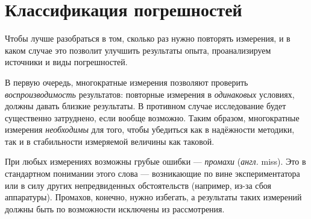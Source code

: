 \enlargethispage{1em}



\section{Классификация погрешностей}

Чтобы лучше разобраться в том, сколько раз нужно повторять измерения,
и в каком случае это позволит улучшить результаты опыта,
проанализируем источники и виды погрешностей.

В первую очередь, многократные измерения позволяют проверить
\emph{воспроизводимость} результатов: повторные измерения в \emph{одинаковых}
условиях, должны давать близкие результаты. В противном случае
исследование будет существенно затруднено, если вообще возможно.
Таким образом, многократные измерения \emph{необходимы} для того,
чтобы убедиться как в надёжности методики, так и в стабильности измеряемой
величины как таковой.

При любых измерениях возможны грубые ошибки --- \emph{промахи}
(\emph{англ.} miss). Это  в стандартном
понимании этого слова --- возникающие по вине экспериментатора
или в силу других непредвиденных обстоятельств (например, из-за сбоя
аппаратуры). Промахов, конечно, нужно избегать, а результаты таких
измерений должны быть по возможности исключены из рассмотрения.

